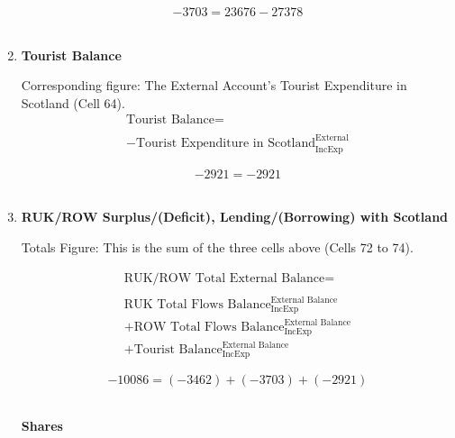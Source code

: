 \begin{enumerate}
\begin{equation} \nonumber
-3703 = 23676-27378
\end{equation}\\


\item \textbf {Tourist Balance}

Corresponding figure: The External Account's Tourist Expenditure in Scotland (Cell 64).\\

\begin{equation}
\begin{split}
\text{Tourist Balance} =  \\ \\
-\text{Tourist Expenditure in Scotland}^\text{External}_\text{IncExp}
\end{split} \label{eq:2.5.78}
\end{equation}

\begin{equation} \nonumber
-2921 = -2921
\end{equation}\\


\item \textbf {RUK/ROW Surplus/(Deficit), Lending/(Borrowing) with Scotland}

Totals Figure: This is the sum of the three cells above (Cells 72 to 74).

\begin{equation}
\begin{split}
\text{RUK/ROW Total External Balance} =  \\ \\
\text{RUK Total Flows Balance}^\text{External Balance}_\text{IncExp}\\
+\text{ROW Total Flows Balance}^\text{External Balance}_\text{IncExp}\\
+\text{Tourist Balance}^\text{External Balance}_\text{IncExp}
\end{split} \label{eq:2.5.79}
\end{equation}

\begin{equation} \nonumber
-10086 = (-3462)+(-3703)+(-2921)
\end{equation}\\

\pagebreak

\begin{center}
\textbf{\LARGE Shares}
\end{center}



\end{enumerate}

